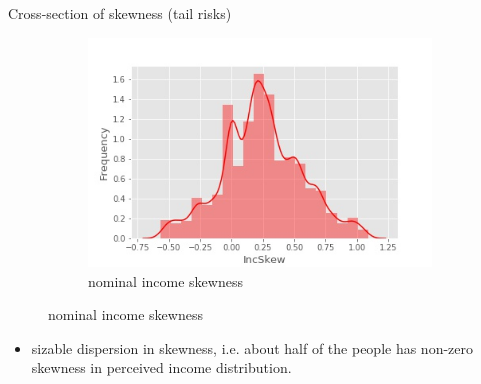 \documentclass{beamer}
\begin{document}
\begin{frame}{Cross-section of skewness (tail risks)}
	\begin{figure}
		\centering
		\label{incskew_hist}
		\begin{subfigure}[b]{0.45\textwidth}
			\centering
			\caption{nominal income skewness}
			\includegraphics[width=\textwidth]{figures/histincSkew}
		\end{subfigure}
	\end{figure}
	\begin{itemize}
		\item sizable dispersion in skewness, i.e. about half of the people has non-zero skewness in perceived income distribution. 
	\end{itemize}
\end{frame}



\end{document}
